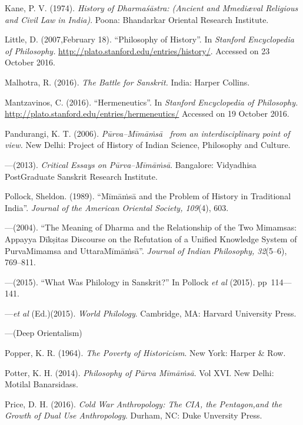 \begin{thebibliography}{99}
  Kane, P. V. (1974). \textit{History of Dharmaśāstra: (Ancient and Mmediæval Religious and Civil Law in India)}. Poona: Bhandarkar Oriental Research Institute.

  Little, D. (2007,February 18). “Philosophy of History”. In \textit{Stanford Encyclopedia of Philosophy.} \url{http://plato.stanford.edu/entries/history/}. Accessed on 23 October 2016.

  Malhotra, R. (2016). \textit{The Battle for Sanskrit.} India: Harper Collins.

  Mantzavinos, C. (2016). “Hermeneutics”. In \textit{Stanford Encyclopedia of Philosophy.} \url{http://plato.stanford.edu/entries/hermeneutics/} Accessed on 19 October 2016.

  Pandurangi, K. T. (2006). \textit{Pūrva–Mīmāṁsā  from an interdisciplinary point of view.} New Delhi: Project of History of Indian Science, Philosophy and Culture.

  —(2013). \textit{Critical Essays on Pūrva–Mīmāṁsā}. Bangalore: Vidyadhisa PostGraduate Sanskrit Research Institute.

  Pollock, Sheldon. (1989). “Mīmāṁsā and the Problem of History in Traditional India”. \textit{Journal of the American Oriental Society, 109}(4), 603.

  —(2004). “The Meaning of Dharma and the Relationship of the Two Mimamsas: Appayya Dīkṣitas Discourse on the Refutation of a Unified Knowledge System of PurvaMimamsa and UttaraMīmāṁsā”. \textit{Journal of Indian Philosophy, 32}(5–6), 769–811.

  —(2015). “What Was Philology in Sanskrit?” In Pollock \textit{et al} (2015). pp~114––141.

  —\textit{et al} (Ed.)(2015). \textit{World Philology}. Cambridge, MA: Harvard University Press.

  —(Deep Orientalism)

  Popper, K. R. (1964). \textit{The Poverty of Historicism}. New York: Harper \& Row.

  Potter, K. H. (2014). \textit{Philosophy of Pūrva Mīmāṁsā}. Vol XVI. New Delhi: Motilal Banarsidass.

  Price, D. H. (2016). \textit{Cold War Anthropology: The CIA, the Pentagon,and the Growth of Dual Use Anthropology}. Durham, NC: Duke Unversity Press.


\end{thebibliography}
